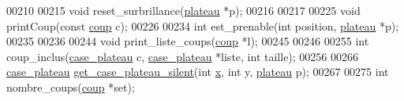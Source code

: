 \begin{DoxyCode}
00210 
00215 \textcolor{keywordtype}{void} reset\_surbrillance(\hyperlink{structplateau}{plateau} *p);
00216 
00217 
00225 \textcolor{keywordtype}{void} printCoup(\textcolor{keyword}{const} \hyperlink{structcoup}{coup} c);
00226 
00234 \textcolor{keywordtype}{int} est\_prenable(\textcolor{keywordtype}{int} position, \hyperlink{structplateau}{plateau} *p);
00235 
00236 
00244 \textcolor{keywordtype}{void} print\_liste\_coups(\hyperlink{structcoup}{coup} *l);
00245 
00246 
00255 \textcolor{keywordtype}{int} coup\_inclus(\hyperlink{structcase__plateau}{case_plateau} c, \hyperlink{structcase__plateau}{case_plateau} *liste, \textcolor{keywordtype}{int} taille);
00256 
00266 \hyperlink{structcase__plateau}{case_plateau} \hyperlink{plateau_8h_a60a8f706865d0ae9087f8d65d4667655}{get_case_plateau_silent}(\textcolor{keywordtype}{int} \hyperlink{plateau_8h_a9e00f85b4b6ec2d8bdfbe94ff40f0eeeacab1e15e82c5976bfb476ddfe145263c}{x}, \textcolor{keywordtype}{int} y, \hyperlink{structplateau}{plateau} p);
00267 
00275 \textcolor{keywordtype}{int} nombre\_coups(\hyperlink{structcoup}{coup} *\textcolor{keyword}{set});
\end{DoxyCode}
